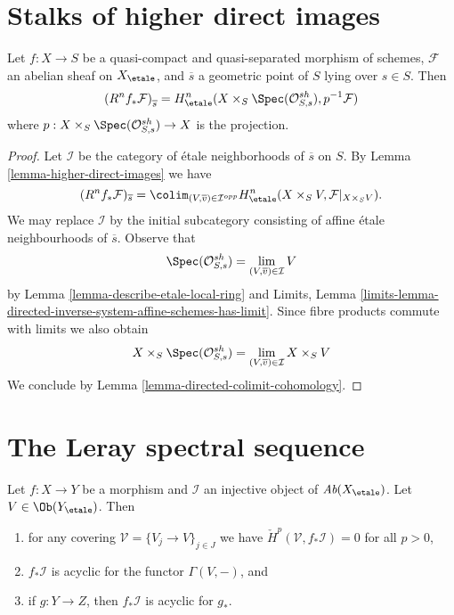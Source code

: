 \section{Stalks of higher direct images}
\label{section-stalks-direct-image}

\begin{theorem}
\label{theorem-higher-direct-images}
Let $f: X \to S$ be a quasi-compact and quasi-separated morphism of schemes,
$\mathcal{F}$ an abelian sheaf on $X_\etale$, and $\overline{s}$ a
geometric point of $S$ lying over $s \in S$. Then
$$
\left(R^nf_* \mathcal{F}\right)_{\overline{s}} =
H_\etale^n( X \times_S \Spec(\mathcal{O}_{S, s}^{sh}),
p^{-1}\mathcal{F})
$$
where $p : X \times_S \Spec(\mathcal{O}_{S, s}^{sh}) \to X$
is the projection.
\end{theorem}

\begin{proof}
Let $\mathcal{I}$ be the category of \'etale neighborhoods of $\overline{s}$
on $S$. By Lemma \ref{lemma-higher-direct-images}
we have
$$
(R^nf_*\mathcal{F})_{\overline{s}} =
\colim_{(V, \overline{v}) \in \mathcal{I}^{opp}}
H_\etale^n(X \times_S V, \mathcal{F}|_{X \times_S V}).
$$
We may replace $\mathcal{I}$ by the initial subcategory consisting
of affine \'etale neighbourhoods of $\overline{s}$. Observe that
$$
\Spec(\mathcal{O}_{S, s}^{sh}) =
\lim_{(V, \overline{v}) \in \mathcal{I}} V
$$
by Lemma \ref{lemma-describe-etale-local-ring} and
Limits, Lemma
\ref{limits-lemma-directed-inverse-system-affine-schemes-has-limit}.
Since fibre products commute with limits we also obtain
$$
X \times_S \Spec(\mathcal{O}_{S, s}^{sh}) =
\lim_{(V, \overline{v}) \in \mathcal{I}} X \times_S V
$$
We conclude by Lemma \ref{lemma-directed-colimit-cohomology}.
\end{proof}





\section{The Leray spectral sequence}
\label{section-leray}

\begin{lemma}
\label{lemma-prepare-leray}
Let $f: X \to Y$ be a morphism and $\mathcal{I}$ an injective object of
$\textit{Ab}(X_\etale)$. Let $V \in \Ob(Y_\etale)$. Then
\begin{enumerate}
\item for any covering $\mathcal{V} = \{V_j\to V\}_{j \in J}$ we have
$\check H^p(\mathcal{V}, f_*\mathcal{I}) = 0$ for all $p > 0$,
\item $f_*\mathcal{I}$ is acyclic for the functor $\Gamma(V, -)$, and
\item if $g : Y \to Z$, then $f_*\mathcal{I}$ is acyclic for $g_*$.
\end{enumerate}
\end{lemma}


